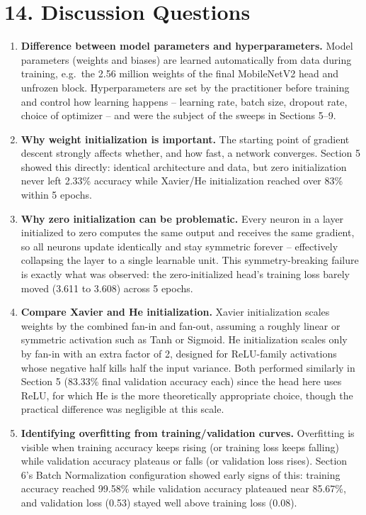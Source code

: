\documentclass[10pt]{article}
\begin{document}
\section*{14. Discussion Questions}

\begin{enumerate}

\item \textbf{Difference between model parameters and hyperparameters.}
Model parameters (weights and biases) are learned automatically from data
during training, e.g.\ the 2.56 million weights of the final MobileNetV2
head and unfrozen block. Hyperparameters are set by the practitioner
before training and control how learning happens -- learning rate, batch
size, dropout rate, choice of optimizer -- and were the subject of the
sweeps in Sections 5--9.

\item \textbf{Why weight initialization is important.}
The starting point of gradient descent strongly affects whether, and how
fast, a network converges. Section 5 showed this directly: identical
architecture and data, but zero initialization never left 2.33\% accuracy
while Xavier/He initialization reached over 83\% within 5 epochs.

\item \textbf{Why zero initialization can be problematic.}
Every neuron in a layer initialized to zero computes the same output and
receives the same gradient, so all neurons update identically and stay
symmetric forever -- effectively collapsing the layer to a single learnable
unit. This symmetry-breaking failure is exactly what was observed: the
zero-initialized head's training loss barely moved (3.611 to 3.608) across
5 epochs.

\item \textbf{Compare Xavier and He initialization.}
Xavier initialization scales weights by the combined fan-in and fan-out,
assuming a roughly linear or symmetric activation such as Tanh or Sigmoid.
He initialization scales only by fan-in with an extra factor of 2, designed
for ReLU-family activations whose negative half kills half the input
variance. Both performed similarly in Section 5 (83.33\% final validation
accuracy each) since the head here uses ReLU, for which He is the more
theoretically appropriate choice, though the practical difference was
negligible at this scale.

\item \textbf{Identifying overfitting from training/validation curves.}
Overfitting is visible when training accuracy keeps rising (or training
loss keeps falling) while validation accuracy plateaus or falls (or
validation loss rises). Section 6's Batch Normalization configuration
showed early signs of this: training accuracy reached 99.58\% while
validation accuracy plateaued near 85.67\%, and validation loss (0.53)
stayed well above training loss (0.08).


\end{enumerate}
\end{document}
